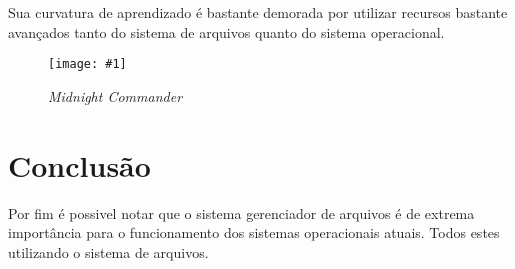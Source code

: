\documentclass[
	12pt,				%
	openright,			%
	twoside,			%
	a4paper,			%
	chapter=TITLE,		%
	section=TITLE,		%
	english,	
	brazil				%
]{abntex2}
\newcommand{\imagem}[3]{
	\begin{figure}[htb]
		\begin{center}
			\texttt{[image: \#1]}
		\end{center}
		\caption{#2}%
	\end{figure}	
}
\begin{document}
Sua curvatura de aprendizado é bastante demorada por utilizar recursos bastante avançados tanto do sistema de arquivos quanto do sistema operacional.

\imagem{mc.png}{\textit{Midnight Commander}}{rótulo_para_referência}

\section{Conclusão}

Por fim é possivel notar que o sistema gerenciador de arquivos é de extrema importância para o funcionamento dos sistemas operacionais atuais. Todos estes utilizando o sistema de arquivos.
\end{document}
